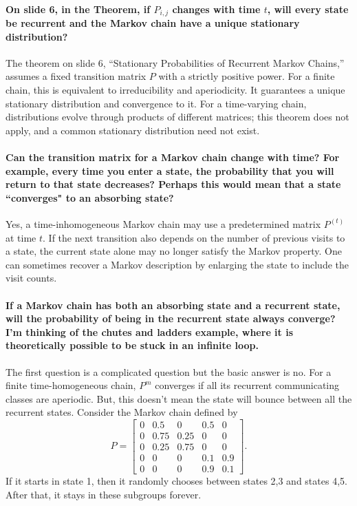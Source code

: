 \documentclass[10pt,english]{article}
\begin{document}
\paragraph{On slide 6, in the Theorem, if $P_{i,j}$ changes with time $t$, will every state be recurrent and the Markov chain have a unique stationary distribution?}


The theorem on slide 6, ``Stationary Probabilities of Recurrent Markov Chains,'' assumes a fixed transition matrix $P$ with a strictly positive power.
For a finite chain, this is equivalent to irreducibility and aperiodicity.
It guarantees a unique stationary distribution and convergence to it.
For a time-varying chain, distributions evolve through products of different matrices; this theorem does not apply, and a common stationary distribution need not exist.


\paragraph{Can the transition matrix for a Markov chain change with time? For example, every time you enter a state, the probability that you will return to that state decreases? Perhaps this would mean that a state ``converges" to an absorbing state?}


Yes, a time-inhomogeneous Markov chain may use a predetermined matrix $P^{(t)}$ at time $t$.
If the next transition also depends on the number of previous visits to a state, the current state alone may no longer satisfy the Markov property.
One can sometimes recover a Markov description by enlarging the state to include the visit counts.


\paragraph{If a Markov chain has both an absorbing state and a recurrent state, will the probability of being in the recurrent state always converge? I'm thinking of the chutes and ladders example, where it is theoretically possible to be stuck in an infinite loop.}

The first question is a complicated question but the basic answer is no.
For a finite time-homogeneous chain, $P^m$ converges if all its recurrent communicating classes are aperiodic.
But, this doesn't mean the state will bounce between all the recurrent states.
Consider the Markov chain defined by
$$P=\begin{bmatrix} 0 & 0.5 & 0 & 0.5 & 0 \\ 0 & 0.75 & 0.25 & 0 & 0 \\ 0 & 0.25 & 0.75 & 0 & 0 \\ 0 & 0 & 0 & 0.1 & 0.9 \\ 0 & 0 & 0 & 0.9 & 0.1 \end{bmatrix}.$$
If it starts in state 1, then it randomly chooses between states 2,3 and states 4,5.
After that, it stays in these subgroups forever.
\end{document}
